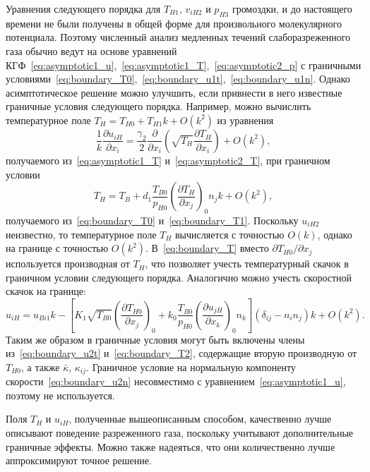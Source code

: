 \documentclass[
aps,%
12pt,%
final,%
notitlepage,%
oneside,%
onecolumn,%
nobibnotes,%
nofootinbib,%
superscriptaddress,%
noshowpacs,%
showkeys,%
floatfix,%
tightenlines,%
centertags]%
{revtex4}
\newcommand{\pder}[2][]{\frac{\partial#1}{\partial#2}}
\newcommand{\Pder}[2][]{\partial#1/\partial#2}
\newcommand{\deltann}[2]{(\delta_{#1#2}-n_#1 n_#2)}
\newcommand{\OO}[1]{O(#1)}
\newcommand{\onwall}[1]{\left(#1\right)_0}
\begin{document}
Уравнения следующего порядка для \(T_{H1}\), \(v_{iH2}\) и \(p_{H3}\) громоздки,
и до настоящего времени не были получены в общей форме для произвольного молекулярного потенциала.
Поэтому численный анализ медленных течений слаборазреженного газа обычно ведут
на основе уравнений КГФ~\eqref{eq:asymptotic1_u},~\eqref{eq:asymptotic1_T},~\eqref{eq:asymptotic2_p}
с граничными условиями~\eqref{eq:boundary_T0},~\eqref{eq:boundary_u1t},~\eqref{eq:boundary_u1n}.
Однако асимптотическое решение можно улучшить,
если привнести в него известные граничные условия следующего порядка.
Например, можно вычислить температурное поле \(T_H = T_{H0} + T_{H1}k + \OO{k^2}\) из уравнения
\begin{equation}\label{eq:asymptotic_T}
    \frac1k\pder[u_{iH}]{x_i} = \frac{\gamma_2}2\pder{x_i}\left(\sqrt{T_H}\pder[T_H]{x_i}\right) + \OO{k^2},
\end{equation}
получаемого из~\eqref{eq:asymptotic1_T} и~\eqref{eq:asymptotic2_T},
при граничном условии
\begin{equation}\label{eq:boundary_T}
    T_H = T_B + d_1\frac{T_{B0}}{p_{H0}}\onwall{\pder[T_H]{x_j}}n_j k + \OO{k^2},
\end{equation}
получаемого из~\eqref{eq:boundary_T0} и~\eqref{eq:boundary_T1}.
Поскольку \(u_{iH2}\) неизвестно, то температурное поле \(T_H\) вычисляется с точностью \(\OO{k}\),
однако на границе с точностью \(\OO{k^2}\).
В~\eqref{eq:boundary_T} вместо \(\Pder[T_{H0}]{x_j}\) используется производная от \(T_H\),
что позволяет учесть температурный скачок в граничном условии следующего порядка.
Аналогично можно учесть скоростной скачок на границе:
\begin{equation}\label{eq:boundary_u}
    u_{iH} = u_{Bi1}k - \left[ K_1\sqrt{T_{B0}}\onwall{\pder[T_{H0}]{x_j}}
        + k_0\frac{T_{B0}}{p_{H0}}\onwall{\pder[u_{jH}]{x_k}}n_k \right] \deltann{i}{j}k + \OO{k^2}.
\end{equation}
Таким же образом в граничные условия могут быть включены члены из~\eqref{eq:boundary_u2t} и~\eqref{eq:boundary_T2},
содержащие вторую производную от \(T_{H0}\), а также \(\bar\kappa\), \(\kappa_{ij}\).
Граничное условие на нормальную компоненту скорости~\eqref{eq:boundary_u2n}
несовместимо с уравнением~\eqref{eq:asymptotic1_u}, поэтому не используется.

Поля \(T_H\) и \(u_{iH}\), полученные вышеописанным способом,
качественно лучше описывают поведение разреженного газа,
поскольку учитывают дополнительные граничные эффекты.
Можно также надеяться, что они количественно лучше аппроксимируют точное решение.
\end{document}
